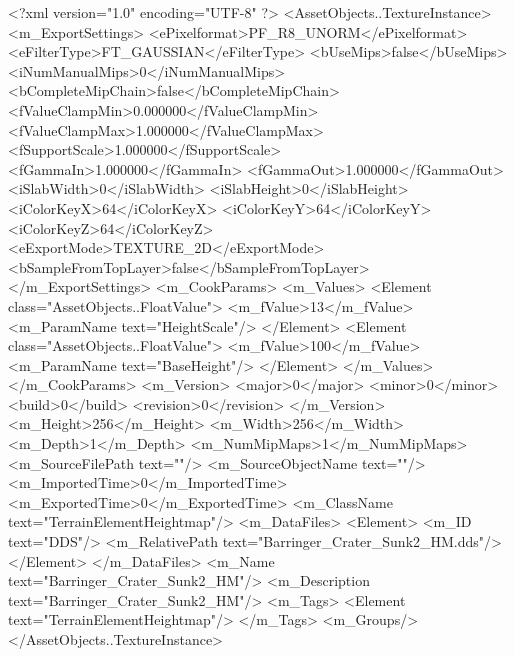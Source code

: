 <?xml version="1.0" encoding="UTF-8" ?>
<AssetObjects..TextureInstance>
<m_ExportSettings>
<ePixelformat>PF_R8_UNORM</ePixelformat>
<eFilterType>FT_GAUSSIAN</eFilterType>
<bUseMips>false</bUseMips>
<iNumManualMips>0</iNumManualMips>
<bCompleteMipChain>false</bCompleteMipChain>
<fValueClampMin>0.000000</fValueClampMin>
<fValueClampMax>1.000000</fValueClampMax>
<fSupportScale>1.000000</fSupportScale>
<fGammaIn>1.000000</fGammaIn>
<fGammaOut>1.000000</fGammaOut>
<iSlabWidth>0</iSlabWidth>
<iSlabHeight>0</iSlabHeight>
<iColorKeyX>64</iColorKeyX>
<iColorKeyY>64</iColorKeyY>
<iColorKeyZ>64</iColorKeyZ>
<eExportMode>TEXTURE_2D</eExportMode>
<bSampleFromTopLayer>false</bSampleFromTopLayer>
</m_ExportSettings>
<m_CookParams>
<m_Values>
<Element class="AssetObjects..FloatValue">
<m_fValue>13</m_fValue>
<m_ParamName text="HeightScale"/>
</Element>
	<Element class="AssetObjects..FloatValue">
		<m_fValue>100</m_fValue>
		<m_ParamName text="BaseHeight"/>
	</Element>
</m_Values>
</m_CookParams>
<m_Version>
<major>0</major>
<minor>0</minor>
<build>0</build>
<revision>0</revision>
</m_Version>
<m_Height>256</m_Height>
<m_Width>256</m_Width>
<m_Depth>1</m_Depth>
<m_NumMipMaps>1</m_NumMipMaps>
<m_SourceFilePath text=""/>
<m_SourceObjectName text=""/>
<m_ImportedTime>0</m_ImportedTime>
<m_ExportedTime>0</m_ExportedTime>
<m_ClassName text="TerrainElementHeightmap"/>
<m_DataFiles>
<Element>
<m_ID text="DDS"/>
<m_RelativePath text="Barringer_Crater_Sunk2_HM.dds"/>
</Element>
</m_DataFiles>
<m_Name text="Barringer_Crater_Sunk2_HM"/>
<m_Description text="Barringer_Crater_Sunk2_HM"/>
<m_Tags>
<Element text="TerrainElementHeightmap"/>
</m_Tags>
<m_Groups/>
</AssetObjects..TextureInstance>
